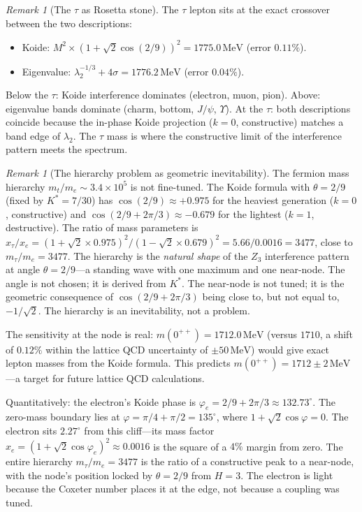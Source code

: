 \documentclass[11pt,a4paper]{article}
\theoremstyle{definition}
\theoremstyle{remark}
\newtheorem{remark}[theorem]{Remark}
\begin{document}
\begin{remark}[The $\tau$ as Rosetta stone]\label{rem:tau_bridge}
The $\tau$ lepton sits at the exact crossover between the two descriptions:
\begin{itemize}[nosep]
\item Koide: $M^2\times(1+\sqrt{2}\cos(2/9))^2 = 1775.0\,\mathrm{MeV}$ (error $0.11\%$).
\item Eigenvalue: $\lambda_2^{-1/3}+4\sigma = 1776.2\,\mathrm{MeV}$ (error $0.04\%$).
\end{itemize}
Below the $\tau$: Koide interference dominates (electron, muon, pion). Above: eigenvalue bands dominate (charm, bottom, $J/\psi$, $\Upsilon$). At the $\tau$: both descriptions coincide because the in-phase Koide projection ($k=0$, constructive) matches a band edge of $\lambda_2$. The $\tau$ mass is where the constructive limit of the interference pattern meets the spectrum.
\end{remark}

\begin{remark}[The hierarchy problem as geometric inevitability]\label{rem:hierarchy_solved}
The fermion mass hierarchy $m_t/m_e\sim 3.4\times 10^5$ is not fine-tuned. The Koide formula with $\theta=2/9$ (fixed by $K^*=7/30$) has $\cos(2/9)\approx +0.975$ for the heaviest generation ($k=0$, constructive) and $\cos(2/9+2\pi/3)\approx -0.679$ for the lightest ($k=1$, destructive). The ratio of mass parameters is $x_\tau/x_e=(1+\sqrt{2}\times 0.975)^2/(1-\sqrt{2}\times 0.679)^2=5.66/0.0016=3477$, close to $m_\tau/m_e=3477$. The hierarchy is the \emph{natural shape} of the $Z_3$ interference pattern at angle $\theta=2/9$---a standing wave with one maximum and one near-node. The angle is not chosen; it is derived from $K^*$. The near-node is not tuned; it is the geometric consequence of $\cos(2/9+2\pi/3)$ being close to, but not equal to, $-1/\sqrt{2}$. The hierarchy is an inevitability, not a problem.

The sensitivity at the node is real: $m(0^{++})=1712.0\,\mathrm{MeV}$ (versus $1710$, a shift of $0.12\%$ within the lattice QCD uncertainty of $\pm 50\,\mathrm{MeV}$) would give exact lepton masses from the Koide formula. This predicts $m(0^{++})=1712\pm 2\,\mathrm{MeV}$---a target for future lattice QCD calculations.

Quantitatively: the electron's Koide phase is $\varphi_e=2/9+2\pi/3\approx 132.73^\circ$. The zero-mass boundary lies at $\varphi=\pi/4+\pi/2=135^\circ$, where $1+\sqrt{2}\cos\varphi=0$. The electron sits $2.27^\circ$ from this cliff---its mass factor $x_e=(1+\sqrt{2}\cos\varphi_e)^2\approx 0.0016$ is the square of a $4\%$ margin from zero. The entire hierarchy $m_\tau/m_e=3477$ is the ratio of a constructive peak to a near-node, with the node's position locked by $\theta=2/9$ from $H=3$. The electron is light because the Coxeter number places it at the edge, not because a coupling was tuned.
\end{remark}
\end{document}
